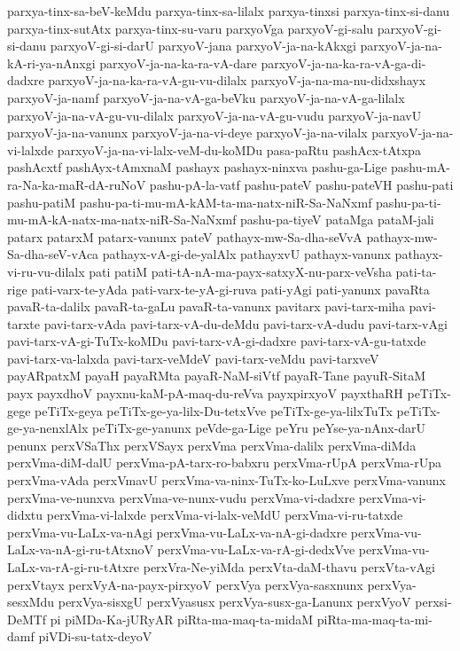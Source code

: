 {parxya-tinx-sa-beV-keMdu
parxya-tinx-sa-lilalx
parxya-tinxsi
parxya-tinx-si-danu
parxya-tinx-sutAtx
parxya-tinx-su-varu
parxyoVga
parxyoV-gi-salu
parxyoV-gi-si-danu
parxyoV-gi-si-darU
parxyoV-jana
parxyoV-ja-na-kAkxgi
parxyoV-ja-na-kA-ri-ya-nAnxgi
parxyoV-ja-na-ka-ra-vA-dare
parxyoV-ja-na-ka-ra-vA-ga-di-dadxre
parxyoV-ja-na-ka-ra-vA-gu-vu-dilalx
parxyoV-ja-na-ma-nu-didxshayx
parxyoV-ja-namf
parxyoV-ja-na-vA-ga-beVku
parxyoV-ja-na-vA-ga-lilalx
parxyoV-ja-na-vA-gu-vu-dilalx
parxyoV-ja-na-vA-gu-vudu
parxyoV-ja-navU
parxyoV-ja-na-vanunx
parxyoV-ja-na-vi-deye
parxyoV-ja-na-vilalx
parxyoV-ja-na-vi-lalxde
parxyoV-ja-na-vi-lalx-veM-du-koMDu
pasa-paRtu
pashAcx-tAtxpa
pashAcxtf
pashAyx-tAmxnaM
pashayx
pashayx-ninxva
pashu-ga-Lige
pashu-mA-ra-Na-ka-maR-dA-ruNoV
pashu-pA-la-vatf
pashu-pateV
pashu-pateVH
pashu-pati
pashu-patiM
pashu-pa-ti-mu-mA-kAM-ta-ma-natx-niR-Sa-NaNxmf
pashu-pa-ti-mu-mA-kA-natx-ma-natx-niR-Sa-NaNxmf
pashu-pa-tiyeV
pataMga
pataM-jali
patarx
patarxM
patarx-vanunx
pateV
pathayx-mw-Sa-dha-seVvA
pathayx-mw-Sa-dha-seV-vAca
pathayx-vA-gi-de-yalAlx
pathayxvU
pathayx-vanunx
pathayx-vi-ru-vu-dilalx
pati
patiM
pati-tA-nA-ma-payx-satxyX-nu-parx-veVsha
pati-ta-rige
pati-varx-te-yAda
pati-varx-te-yA-gi-ruva
pati-yAgi
pati-yanunx
pavaRta
pavaR-ta-dalilx
pavaR-ta-gaLu
pavaR-ta-vanunx
pavitarx
pavi-tarx-miha
pavi-tarxte
pavi-tarx-vAda
pavi-tarx-vA-du-deMdu
pavi-tarx-vA-dudu
pavi-tarx-vAgi
pavi-tarx-vA-gi-TuTx-koMDu
pavi-tarx-vA-gi-dadxre
pavi-tarx-vA-gu-tatxde
pavi-tarx-va-lalxda
pavi-tarx-veMdeV
pavi-tarx-veMdu
pavi-tarxveV
payARpatxM
payaH
payaRMta
payaR-NaM-siVtf
payaR-Tane
payuR-SitaM
payx
payxdhoV
payxnu-kaM-pA-maq-du-reVva
payxpirxyoV
payxthaRH
peTiTx-gege
peTiTx-geya
peTiTx-ge-ya-lilx-Du-tetxVve
peTiTx-ge-ya-lilxTuTx
peTiTx-ge-ya-nenxlAlx
peTiTx-ge-yanunx
peVde-ga-Lige
peYru
peYse-ya-nAnx-darU
penunx
perxVSaThx
perxVSayx
perxVma
perxVma-dalilx
perxVma-diMda
perxVma-diM-dalU
perxVma-pA-tarx-ro-babxru
perxVma-rUpA
perxVma-rUpa
perxVma-vAda
perxVmavU
perxVma-va-ninx-TuTx-ko-LuLxve
perxVma-vanunx
perxVma-ve-nunxva
perxVma-ve-nunx-vudu
perxVma-vi-dadxre
perxVma-vi-didxtu
perxVma-vi-lalxde
perxVma-vi-lalx-veMdU
perxVma-vi-ru-tatxde
perxVma-vu-LaLx-va-nAgi
perxVma-vu-LaLx-va-nA-gi-dadxre
perxVma-vu-LaLx-va-nA-gi-ru-tAtxnoV
perxVma-vu-LaLx-va-rA-gi-dedxVve
perxVma-vu-LaLx-va-rA-gi-ru-tAtxre
perxVra-Ne-yiMda
perxVta-daM-thavu
perxVta-vAgi
perxVtayx
perxVyA-na-payx-pirxyoV
perxVya
perxVya-sasxnunx
perxVya-sesxMdu
perxVya-sisxgU
perxVyasusx
perxVya-susx-ga-Lanunx
perxVyoV
perxsi-DeMTf
pi
piMDa-Ka-jURyAR
piRta-ma-maq-ta-midaM
piRta-ma-maq-ta-mi-damf
piVDi-su-tatx-deyoV
}
